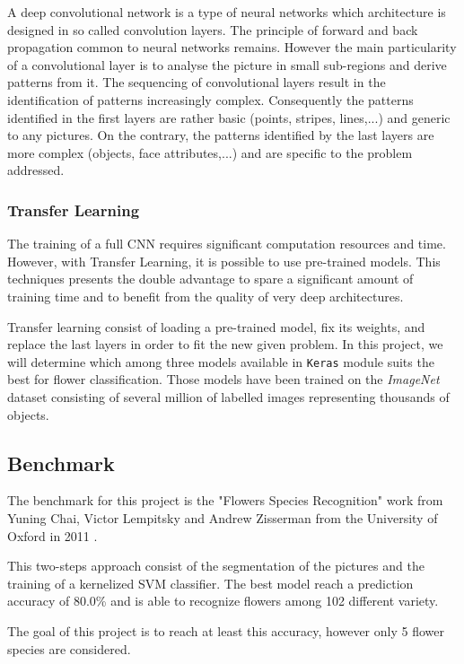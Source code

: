 A deep convolutional network is a type of neural networks which architecture is designed in so called convolution layers. The principle of forward and back propagation common to neural networks remains. However the main particularity of a convolutional layer is to analyse the picture in small sub-regions and derive patterns from it. The sequencing of convolutional layers result in the identification of patterns increasingly complex. Consequently the patterns identified in the first layers are rather basic (points, stripes, lines,...) and generic to any pictures. On the contrary, the patterns identified by the last layers are more complex (objects, face attributes,...) and are specific to the problem addressed. 

\subsubsection{Transfer Learning}

The training of a full CNN requires significant computation resources and time. However, with Transfer Learning, it is possible to use pre-trained models. This techniques presents the double advantage to spare a significant amount of training time and to benefit from the quality of very deep architectures. 

Transfer learning consist of loading a pre-trained model, fix its weights, and replace the last layers in order to fit the new given problem.  
In this project, we will determine which among three models available in \texttt{Keras} module suits the best for flower classification. Those models have been trained on the \textit{ImageNet} dataset consisting of several million of labelled images representing thousands of objects. 



\subsection{Benchmark}
\label{subsec:benchmark}

The benchmark for this project is the "Flowers Species Recognition" work from Yuning Chai, Victor Lempitsky and Andrew Zisserman from the University of Oxford in 2011 \cite{Chai_BiCos, Chai_BiCos_demo} . 

This two-steps approach consist of the segmentation of the pictures and the training of a kernelized SVM classifier. The best model reach a prediction accuracy of 80.0\% and is able to recognize flowers among 102 different variety.

The goal of this project is to reach at least this accuracy, however only 5 flower species are considered. 

